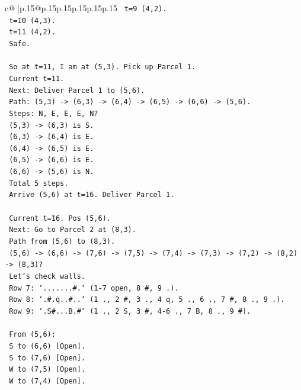 \documentclass{article}
\begin{document}
{\begin{supertabular}{c@{$\;$}|p{.15\linewidth}@{}p{.15\linewidth}p{.15\linewidth}p{.15\linewidth}p{.15\linewidth}p{.15\linewidth}}
{{{\texttt{     t=9 (4,2).} \\
\texttt{     t=10 (4,3).} \\
\texttt{     t=11 (4,2).} \\
\texttt{     Safe.} \\
\\ 
\texttt{   So at t=11, I am at (5,3). Pick up Parcel 1.} \\
\texttt{   Current t=11.} \\
\texttt{   Next: Deliver Parcel 1 to (5,6).} \\
\texttt{   Path: (5,3) {-}> (6,3) {-}> (6,4) {-}> (6,5) {-}> (6,6) {-}> (5,6).} \\
\texttt{   Steps: N, E, E, E, N?} \\
\texttt{   (5,3) {-}> (6,3) is S.} \\
\texttt{   (6,3) {-}> (6,4) is E.} \\
\texttt{   (6,4) {-}> (6,5) is E.} \\
\texttt{   (6,5) {-}> (6,6) is E.} \\
\texttt{   (6,6) {-}> (5,6) is N.} \\
\texttt{   Total 5 steps.} \\
\texttt{   Arrive (5,6) at t=16. Deliver Parcel 1.} \\
\\ 
\texttt{   Current t=16. Pos (5,6).} \\
\texttt{   Next: Go to Parcel 2 at (8,3).} \\
\texttt{   Path from (5,6) to (8,3).} \\
\texttt{   (5,6) {-}> (6,6) {-}> (7,6) {-}> (7,5) {-}> (7,4) {-}> (7,3) {-}> (7,2) {-}> (8,2) {-}> (8,3)?} \\
\texttt{   Let's check walls.} \\
\texttt{   Row 7: `.......\#.` (1{-}7 open, 8 \#, 9 .).} \\
\texttt{   Row 8: `.\#.q..\#..` (1 ., 2 \#, 3 ., 4 q, 5 ., 6 ., 7 \#, 8 ., 9 .).} \\
\texttt{   Row 9: `.S\#...B.\#` (1 ., 2 S, 3 \#, 4{-}6 ., 7 B, 8 ., 9 \#).} \\
\\ 
\texttt{   From (5,6):} \\
\texttt{   S to (6,6) {[}Open{]}.} \\
\texttt{   S to (7,6) {[}Open{]}.} \\
\texttt{   W to (7,5) {[}Open{]}.} \\
\texttt{   W to (7,4) {[}Open{]}.} \\
}}}
\end{supertabular}}
\end{document}
